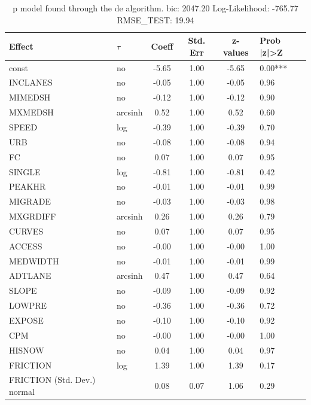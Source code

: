 \begin{table}
	\caption{p model found through the de algorithm. bic: 2047.20 Log-Likelihood: -765.77 RMSE_TEST: 19.94}
	\begin{center}
		\begin{tabular}{|l|l|c|c|c|l|}
			\hline
			Effect & $\tau$ & Coeff & Std. Err & z-values & Prob |z|>Z \\
			\hline
			const & no & -5.65 & 1.00 & -5.65 & 0.00*** \\
			\hline
			INCLANES & no & -0.05 & 1.00 & -0.05 & 0.96 \\
			\hline
			MIMEDSH & no & -0.12 & 1.00 & -0.12 & 0.90 \\
			\hline
			MXMEDSH & arcsinh & 0.52 & 1.00 & 0.52 & 0.60 \\
			\hline
			SPEED & log & -0.39 & 1.00 & -0.39 & 0.70 \\
			\hline
			URB & no & -0.08 & 1.00 & -0.08 & 0.94 \\
			\hline
			FC & no & 0.07 & 1.00 & 0.07 & 0.95 \\
			\hline
			SINGLE & log & -0.81 & 1.00 & -0.81 & 0.42 \\
			\hline
			PEAKHR & no & -0.01 & 1.00 & -0.01 & 0.99 \\
			\hline
			MIGRADE & no & -0.03 & 1.00 & -0.03 & 0.98 \\
			\hline
			MXGRDIFF & arcsinh & 0.26 & 1.00 & 0.26 & 0.79 \\
			\hline
			CURVES & no & 0.07 & 1.00 & 0.07 & 0.95 \\
			\hline
			ACCESS & no & -0.00 & 1.00 & -0.00 & 1.00 \\
			\hline
			MEDWIDTH & no & -0.01 & 1.00 & -0.01 & 0.99 \\
			\hline
			ADTLANE & arcsinh & 0.47 & 1.00 & 0.47 & 0.64 \\
			\hline
			SLOPE & no & -0.09 & 1.00 & -0.09 & 0.92 \\
			\hline
			LOWPRE & no & -0.36 & 1.00 & -0.36 & 0.72 \\
			\hline
			EXPOSE & no & -0.10 & 1.00 & -0.10 & 0.92 \\
			\hline
			CPM & no & -0.00 & 1.00 & -0.00 & 1.00 \\
			\hline
			HISNOW & no & 0.04 & 1.00 & 0.04 & 0.97 \\
			\hline
			FRICTION & log & 1.39 & 1.00 & 1.39 & 0.17 \\
			\hline
			FRICTION (Std. Dev.) normal &  & 0.08 & 0.07 & 1.06 & 0.29 \\
			\hline
		\end{tabular}
	\end{center}
\end{table}